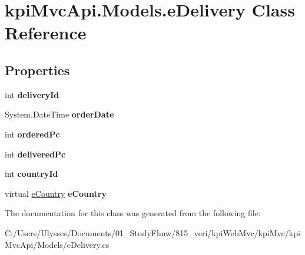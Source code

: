 \hypertarget{classkpi_mvc_api_1_1_models_1_1e_delivery}{}\section{kpi\+Mvc\+Api.\+Models.\+e\+Delivery Class Reference}
\label{classkpi_mvc_api_1_1_models_1_1e_delivery}
\subsection*{Properties}
\begin{DoxyCompactItemize}
\item 
\mbox{\label{classkpi_mvc_api_1_1_models_1_1e_delivery_a96902a8fe9cceb0bb2c36d8af461d989}} 
int {\bfseries delivery\+Id}
\item 
\mbox{\label{classkpi_mvc_api_1_1_models_1_1e_delivery_abb80a8a512ad34fb55bf08a1db0685cb}} 
System.\+Date\+Time {\bfseries order\+Date}
\item 
\mbox{\label{classkpi_mvc_api_1_1_models_1_1e_delivery_a9804110f4e7bb19508dfdabfa8e23332}} 
int {\bfseries ordered\+Pc}
\item 
\mbox{\label{classkpi_mvc_api_1_1_models_1_1e_delivery_a34de1afa042862ed4032c507f91f767e}} 
int {\bfseries delivered\+Pc}
\item 
\mbox{\label{classkpi_mvc_api_1_1_models_1_1e_delivery_ae29f78608820057bd198945920dd71e3}} 
int {\bfseries country\+Id}
\item 
\mbox{\label{classkpi_mvc_api_1_1_models_1_1e_delivery_ab0e02fd0ff3c0ed5c192da716619de39}} 
virtual \hyperlink{classkpi_mvc_api_1_1_models_1_1e_country}{e\+Country} {\bfseries e\+Country}
\end{DoxyCompactItemize}


The documentation for this class was generated from the following file\+:\begin{DoxyCompactItemize}
\item 
C\+:/\+Users/\+Ulysses/\+Documents/01\+\_\+\+Study\+Fhnw/815\+\_\+veri/kpi\+Web\+Mvc/kpi\+Mvc/kpi\+Mvc\+Api/\+Models/e\+Delivery.\+cs\end{DoxyCompactItemize}
